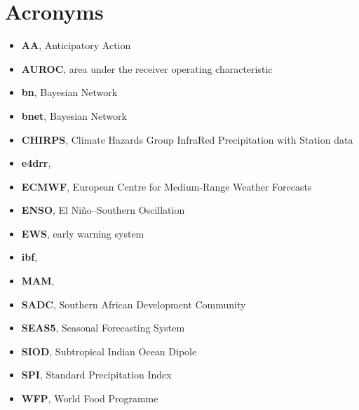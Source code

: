 \documentclass{article}
\begin{document}
\section*{Acronyms}
\begin{itemize}
\item {\bf AA}, Anticipatory Action
\item {\bf AUROC}, area under the receiver operating characteristic
\item {\bf bn}, Bayesian Network
\item {\bf bnet}, Bayesian Network
\item {\bf CHIRPS}, Climate Hazards Group InfraRed Precipitation with Station data
\item {\bf e4drr}, 
\item {\bf ECMWF}, European Centre for Medium-Range Weather Forecasts
\item {\bf ENSO}, El Niño–Southern Oscillation
\item {\bf EWS}, early warning system
\item {\bf ibf}, 
\item {\bf MAM}, 
\item {\bf SADC}, Southern African Development Community
\item {\bf SEAS5}, Seasonal Forecasting System
\item {\bf SIOD}, Subtropical Indian Ocean Dipole
\item {\bf SPI}, Standard Precipitation Index
\item {\bf WFP}, World Food Programme
\end{itemize}
\end{document}
